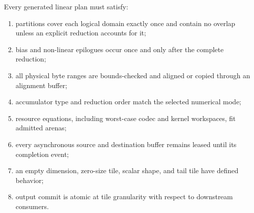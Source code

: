 Every generated linear plan must satisfy:

\begin{enumerate}
  \item partitions cover each logical domain exactly once and contain no overlap unless an explicit reduction accounts for it;
  \item bias and non-linear epilogues occur once and only after the complete reduction;
  \item all physical byte ranges are bounds-checked and aligned or copied through an alignment buffer;
  \item accumulator type and reduction order match the selected numerical mode;
  \item resource equations, including worst-case codec and kernel workspaces, fit admitted arenas;
  \item every asynchronous source and destination buffer remains leased until its completion event;
  \item an empty dimension, zero-size tile, scalar shape, and tail tile have defined behavior;
  \item output commit is atomic at tile granularity with respect to downstream consumers.
\end{enumerate}
